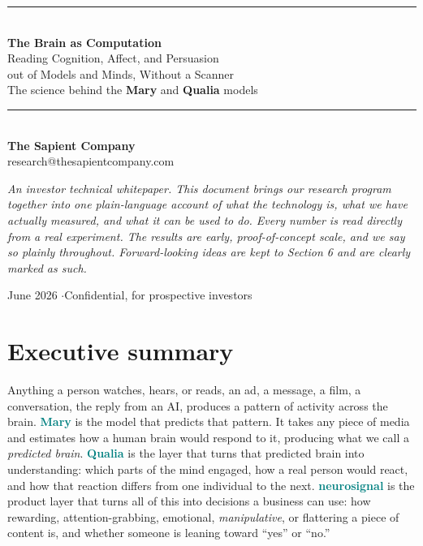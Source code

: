 \documentclass[11pt]{article}
\newcommand{\keyterm}[1]{\textcolor{teal}{\textbf{#1}}}
\begin{document}
\begin{titlepage}
\centering
\sffamily
\vspace*{1.8cm}
{\color{slate}\rule{\textwidth}{1.4pt}}\\[0.7cm]
{\Huge\bfseries\color{slate} The Brain as Computation}\\[0.55cm]
{\LARGE\color{slate} Reading Cognition, Affect, and Persuasion \\[0.25cm] out of Models and Minds, Without a Scanner}\\[0.8cm]
{\large The science behind the \textbf{Mary} and \textbf{Qualia} models}\\[0.45cm]
{\color{slate}\rule{\textwidth}{1.4pt}}\\[1.1cm]

{\large\bfseries The Sapient Company}\\[0.25cm]
{\normalsize research@thesapientcompany.com}\\[1.6cm]

\begin{minipage}{0.86\textwidth}
\rmfamily\small\itshape\color{slate}
An investor technical whitepaper. This document brings our research program together into
one plain-language account of what the technology is, what we have actually measured, and
what it can be used to do. Every number is read directly from a real experiment. The
results are early, proof-of-concept scale, and we say so plainly throughout. Forward-looking
ideas are kept to Section 6 and are clearly marked as such.
\end{minipage}

\vfill
{\small\color{slate} June 2026 \quad$\cdot$\quad Confidential, for prospective investors}
\end{titlepage}

\section*{Executive summary}

Anything a person watches, hears, or reads, an ad, a message, a film, a conversation, the
reply from an AI, produces a pattern of activity across the brain. \keyterm{Mary} is the
model that predicts that pattern. It takes any piece of media and estimates how a human
brain would respond to it, producing what we call a \emph{predicted brain}. \keyterm{Qualia}
is the layer that turns that predicted brain into understanding: which parts of the mind
engaged, how a real person would react, and how that reaction differs from one individual
to the next. \keyterm{neurosignal} is the product layer that turns all of this into
decisions a business can use: how rewarding, attention-grabbing, emotional, \emph{manipulative},
or flattering a piece of content is, and whether someone is leaning toward ``yes'' or ``no.''
\end{document}
